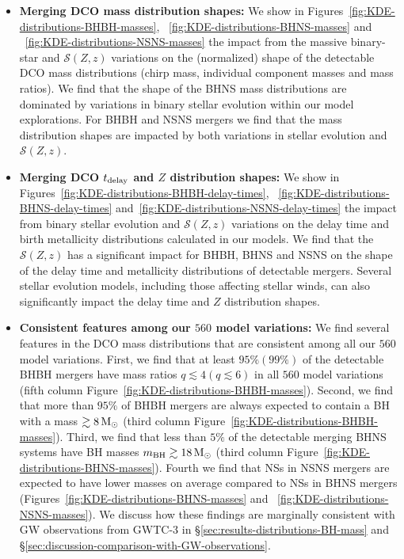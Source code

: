 \documentclass[fleqn,usenatbib]{mnras}
\newcommand{\Zi}{\ensuremath{Z}\xspace}
\newcommand{\Msun}{\ensuremath{\,\rm{M}_{\odot}}\xspace}
\newcommand{\SFRD}{\ensuremath{\mathcal{S}(Z,z)}\xspace}
\newcommand{\tdelay}{\ensuremath{{t}_{\rm{delay}}}\xspace}
\newcommand{\mbhf}{\ensuremath{m_{\rm{BH}}}\xspace}
\newcommand{\qf}{\ensuremath{q}\xspace}
\newcommand{\Nmodels}{\ensuremath{560}\xspace}
\begin{document}
\begin{itemize}
    
    \item \textbf{Merging \ac{DCO} mass distribution shapes:} We show in Figures~\ref{fig:KDE-distributions-BHBH-masses}, ~\ref{fig:KDE-distributions-BHNS-masses} and ~\ref{fig:KDE-distributions-NSNS-masses}  the impact from the massive binary-star and \SFRD variations on the (normalized) shape of the detectable \ac{DCO} mass distributions (chirp mass, individual component masses and mass ratios). 
    We find that the shape of the \ac{BHNS} mass distributions are dominated by variations in binary stellar evolution within our model explorations. 
    For \ac{BHBH} and NSNS mergers we find that the mass distribution shapes are impacted by both variations in stellar evolution and \SFRD.\\ 


    \item \textbf{Merging \ac{DCO} \tdelay and \Zi distribution shapes:} We show in  Figures~\ref{fig:KDE-distributions-BHBH-delay-times}, ~\ref{fig:KDE-distributions-BHNS-delay-times} and~\ref{fig:KDE-distributions-NSNS-delay-times} the impact from binary stellar evolution and \SFRD variations on the delay time and birth metallicity distributions calculated in our models. 
    We find that the \SFRD has a significant impact for BHBH, BHNS and NSNS on the shape of the delay time and metallicity distributions of detectable mergers.  
    Several stellar evolution models, including those affecting stellar winds, can also significantly impact the delay time and \Zi distribution shapes.\\
    
    \item \textbf{Consistent features among our \Nmodels model variations:} We find several features in the \ac{DCO} mass distributions that are consistent among all our \Nmodels model variations. 
    First, we find that at least $95\%(99\%)$ of the detectable \ac{BHBH} mergers have mass ratios ${\qf\lesssim 4 (\qf \lesssim 6)}$ in all \Nmodels model variations (fifth column Figure~\ref{fig:KDE-distributions-BHBH-masses}). Second, we find that more than $95\%$ of \ac{BHBH} mergers are always expected to contain a \ac{BH} with a mass $\gtrsim 8\Msun$ (third column Figure~\ref{fig:KDE-distributions-BHBH-masses}). 
    Third, we find that less than $5\%$  of the detectable merging \ac{BHNS} systems have \ac{BH} masses ${\mbhf \gtrsim 18\Msun}$ (third column Figure~\ref{fig:KDE-distributions-BHNS-masses}). Fourth we find that  \acp{NS} in NSNS mergers are expected to have lower masses on average compared to \acp{NS} in \ac{BHNS} mergers (Figures~\ref{fig:KDE-distributions-BHNS-masses} and ~\ref{fig:KDE-distributions-NSNS-masses}).
    We discuss how these findings are marginally consistent with GW observations from GWTC-3 in \S\ref{sec:results-distributions-BH-mass} and \S\ref{sec:discussion-comparison-with-GW-observations}.
\end{itemize}
\end{document}
